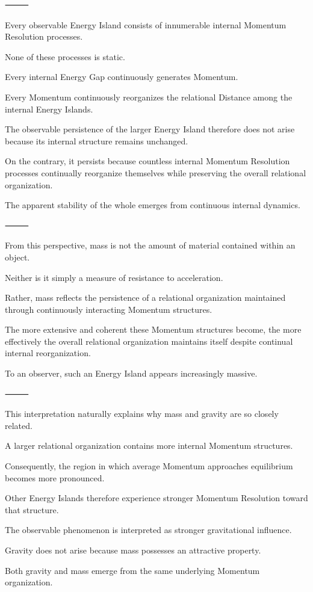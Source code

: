 ⸻

Every observable Energy Island consists of innumerable internal Momentum Resolution processes.

None of these processes is static.

Every internal Energy Gap continuously generates Momentum.

Every Momentum continuously reorganizes the relational Distance among the internal Energy Islands.

The observable persistence of the larger Energy Island therefore does not arise because its internal structure remains unchanged.

On the contrary, it persists because countless internal Momentum Resolution processes continually reorganize themselves while preserving the overall relational organization.

The apparent stability of the whole emerges from continuous internal dynamics.

⸻

From this perspective, mass is not the amount of material contained within an object.

Neither is it simply a measure of resistance to acceleration.

Rather, mass reflects the persistence of a relational organization maintained through continuously interacting Momentum structures.

The more extensive and coherent these Momentum structures become, the more effectively the overall relational organization maintains itself despite continual internal reorganization.

To an observer, such an Energy Island appears increasingly massive.

⸻

This interpretation naturally explains why mass and gravity are so closely related.

A larger relational organization contains more internal Momentum structures.

Consequently, the region in which average Momentum approaches equilibrium becomes more pronounced.

Other Energy Islands therefore experience stronger Momentum Resolution toward that structure.

The observable phenomenon is interpreted as stronger gravitational influence.

Gravity does not arise because mass possesses an attractive property.

Both gravity and mass emerge from the same underlying Momentum organization.

